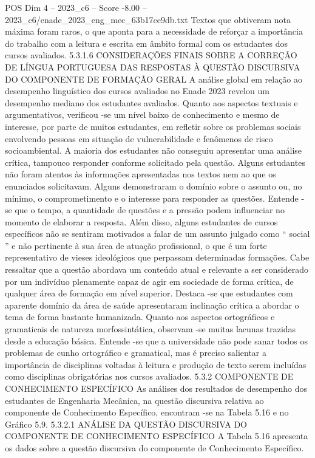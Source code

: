 \begin{textsample}{POS Dim 4 – 2023\_c6 – Score -8.00 – 2023\_c6/enade\_2023\_eng\_mec\_63b17ce9db.txt}
Textos que obtiveram nota máxima foram raros, o que aponta para a necessidade de reforçar a importância do trabalho com a leitura e escrita em âmbito formal com os estudantes dos cursos avaliados. 5.3.1.6 CONSIDERAÇÕES FINAIS SOBRE A CORREÇÃO DE LÍNGUA PORTUGUESA DAS RESPOSTAS À QUESTÃO DISCURSIVA DO COMPONENTE DE FORMAÇÃO GERAL A análise global em relação ao desempenho linguístico dos cursos avaliados no Enade 2023 revelou um desempenho mediano dos estudantes avaliados.
Quanto aos aspectos textuais e argumentativos, verificou -se um nível baixo de conhecimento e mesmo de interesse, por parte de muitos estudantes, em refletir sobre os problemas sociais envolvendo pessoas em situação de vulnerabilidade e fenômenos de risco socioambiental.
A maioria dos estudantes não conseguiu apresentar uma análise crítica, tampouco responder conforme solicitado pela questão.
Alguns estudantes não foram atentos às informações apresentadas nos textos nem ao que os enunciados solicitavam.
Alguns demonstraram o domínio sobre o assunto ou, no mínimo, o comprometimento e o interesse para responder as questões.
Entende -se que o tempo, a quantidade de questões e a pressão podem influenciar no momento de elaborar a resposta.
Além disso, alguns estudantes de cursos específicos não se sentiram motivados a falar de um assunto julgado como “ social ” e não pertinente à sua área de atuação profissional, o que é um forte representativo de vieses ideológicos que perpassam determinadas formações.
Cabe ressaltar que a questão abordava um conteúdo atual e relevante a ser considerado por um indivíduo plenamente capaz de agir em sociedade de forma crítica, de qualquer área de formação em nível superior.
Destaca -se que estudantes com aparente domínio da área de saúde apresentaram inclinação crítica a abordar o tema de forma bastante humanizada.
Quanto aos aspectos ortográficos e gramaticais de natureza morfossintática, observam -se muitas lacunas trazidas desde a educação básica.
Entende -se que a universidade não pode sanar todos os problemas de cunho ortográfico e gramatical, mas é preciso salientar a importância de disciplinas voltadas à leitura e produção de texto serem incluídas como disciplinas obrigatórias nos cursos avaliados. 5.3.2 COMPONENTE DE CONHECIMENTO ESPECÍFICO As análises dos resultados de desempenho dos estudantes de Engenharia Mecânica, na questão discursiva relativa ao componente de Conhecimento Específico, encontram -se na Tabela 5.16 e no Gráfico 5.9. 5.3.2.1 ANÁLISE DA QUESTÃO DISCURSIVA DO COMPONENTE DE CONHECIMENTO ESPECÍFICO A Tabela 5.16 apresenta os dados sobre a questão discursiva do componente de Conhecimento Específico.

\end{textsample}
